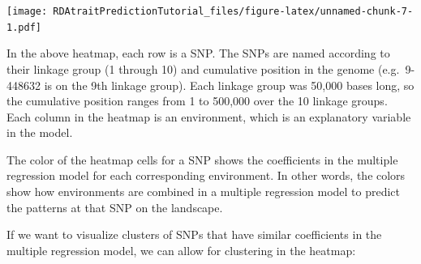 \documentclass[
]{article}
\newenvironment{Shaded}{\begin{snugshade}}{\end{snugshade}}
\newcommand{\AttributeTok}[1]{\textcolor[rgb]{0.77,0.63,0.00}{#1}}
\newcommand{\CommentTok}[1]{\textcolor[rgb]{0.56,0.35,0.01}{\textit{#1}}}
\newcommand{\ConstantTok}[1]{\textcolor[rgb]{0.00,0.00,0.00}{#1}}
\newcommand{\DecValTok}[1]{\textcolor[rgb]{0.00,0.00,0.81}{#1}}
\newcommand{\FloatTok}[1]{\textcolor[rgb]{0.00,0.00,0.81}{#1}}
\newcommand{\FunctionTok}[1]{\textcolor[rgb]{0.00,0.00,0.00}{#1}}
\newcommand{\NormalTok}[1]{#1}
\newcommand{\OtherTok}[1]{\textcolor[rgb]{0.56,0.35,0.01}{#1}}
\newcommand{\SpecialCharTok}[1]{\textcolor[rgb]{0.00,0.00,0.00}{#1}}
\newcommand{\StringTok}[1]{\textcolor[rgb]{0.31,0.60,0.02}{#1}}
\begin{document}
\begin{Shaded}
\end{Shaded}

\texttt{[image: RDAtraitPredictionTutorial\_files/figure-latex/unnamed-chunk-7-1.pdf]}

In the above heatmap, each row is a SNP. The SNPs are named according to
their linkage group (1 through 10) and cumulative position in the genome
(e.g.~9-448632 is on the 9th linkage group). Each linkage group was
50,000 bases long, so the cumulative position ranges from 1 to 500,000
over the 10 linkage groups. Each column in the heatmap is an
environment, which is an explanatory variable in the model.

The color of the heatmap cells for a SNP shows the coefficients in the
multiple regression model for each corresponding environment. In other
words, the colors show how environments are combined in a multiple
regression model to predict the patterns at that SNP on the landscape.

If we want to visualize clusters of SNPs that have similar coefficients
in the multiple regression model, we can allow for clustering in the
heatmap:
\end{document}
